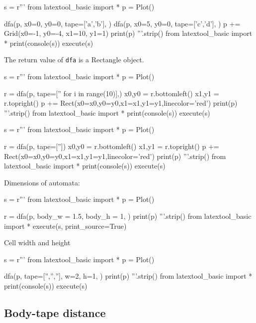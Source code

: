\begin{python}
s = r'''
from latextool_basic import *
p = Plot()

dfa(p, x0=0, y0=0,
    tape=['a','b'],
    )
dfa(p, x0=5, y0=0,
    tape=['c','d'],
    )
p += Grid(x0=-1, y0=-4, x1=10, y1=1)
print(p)
'''.strip()
from latextool_basic import *
print(console(s))
execute(s)
\end{python}


The return value of \verb!dfa! is a Rectangle object.

\begin{python}
s = r'''
from latextool_basic import *
p = Plot()

r = dfa(p, tape=['' for i in range(10)],)
x0,y0 = r.bottomleft()
x1,y1 = r.topright()
p += Rect(x0=x0,y0=y0,x1=x1,y1=y1,linecolor='red')
print(p)
'''.strip()
from latextool_basic import *
print(console(s))
execute(s)
\end{python}


\begin{python}
  s = r'''
from latextool_basic import *
p = Plot()

r = dfa(p, tape=[''])
x0,y0 = r.bottomleft()
x1,y1 = r.topright()
p += Rect(x0=x0,y0=y0,x1=x1,y1=y1,linecolor='red')
print(p)
'''.strip()
from latextool_basic import *
print(console(s))
execute(s)
\end{python}



\newpage

Dimensions of automata:

\begin{python}
s = r'''
from latextool_basic import *
p = Plot()

r = dfa(p,
    body_w = 1.5,
    body_h = 1,
    )
print(p)
'''.strip()
from latextool_basic import *
execute(s, print_source=True)
\end{python}


\newpage
Cell width and height
\begin{python}
s = r'''
from latextool_basic import *
p = Plot()

dfa(p,
    tape=['','',''],
    w=2, h=1,
    )
print(p)
'''.strip()
from latextool_basic import *
print(console(s))
execute(s)
\end{python}


\newpage
\subsection{Body-tape distance}

